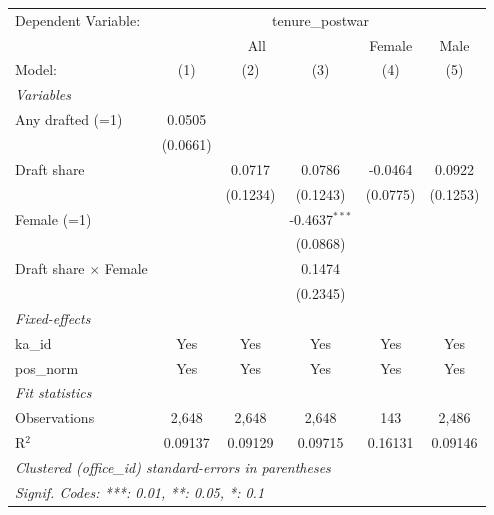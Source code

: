 \begingroup
\centering
\begin{tabular}{lccccc}
   \tabularnewline \midrule \midrule
   Dependent Variable: & \multicolumn{5}{c}{tenure\_postwar}\\
    & \multicolumn{3}{c}{All} & Female & Male \\ 
   Model:                       & (1)      & (2)      & (3)             & (4)      & (5)\\  
   \midrule
   \emph{Variables}\\
   Any drafted (=1)             & 0.0505   &          &                 &          &   \\   
                                & (0.0661) &          &                 &          &   \\   
   Draft share                  &          & 0.0717   & 0.0786          & -0.0464  & 0.0922\\   
                                &          & (0.1234) & (0.1243)        & (0.0775) & (0.1253)\\   
   Female (=1)                  &          &          & -0.4637$^{***}$ &          &   \\   
                                &          &          & (0.0868)        &          &   \\   
   Draft share $\times$ Female  &          &          & 0.1474          &          &   \\   
                                &          &          & (0.2345)        &          &   \\   
   \midrule
   \emph{Fixed-effects}\\
   ka\_id                       & Yes      & Yes      & Yes             & Yes      & Yes\\  
   pos\_norm                    & Yes      & Yes      & Yes             & Yes      & Yes\\  
   \midrule
   \emph{Fit statistics}\\
   Observations                 & 2,648    & 2,648    & 2,648           & 143      & 2,486\\  
   R$^2$                        & 0.09137  & 0.09129  & 0.09715         & 0.16131  & 0.09146\\  
   \midrule \midrule
   \multicolumn{6}{l}{\emph{Clustered (office\_id) standard-errors in parentheses}}\\
   \multicolumn{6}{l}{\emph{Signif. Codes: ***: 0.01, **: 0.05, *: 0.1}}\\
\end{tabular}
\par\endgroup


